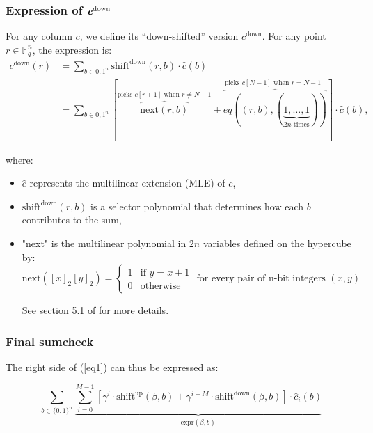 \documentclass{article}
\newcommand{\Fq}{\mathbb F_q}
\begin{document}
\subsubsection{\texorpdfstring{Expression of $\textbf{\textit{c}}^{\text{down}}$}{}}


For any column $c$, we define its “down-shifted” version $c^{\text{down}}$. For any point $r \in \Fq^n$, the expression is:
\begin{equation*}
\begin{aligned}
c^{\text{down}}(r) &= \sum_{b \in {0, 1}^n} \text{shift}^{\text{down}}(r, b) \cdot \widehat{c}(b) \\
&= \sum_{b \in {0, 1}^n} \left[ \overbrace{\text{next}(r, b)}^{\text{picks $c[r + 1]$ when $r \neq N - 1$}} + \overbrace{eq((r, b), (\underbrace{1, \dots, 1}_{2n \text{ times}}))}^{\text{picks $c[N - 1]$ when $r = N - 1$ }} \right] \cdot \widehat{c}(b),
\end{aligned}
\end{equation*}



where:
\begin{itemize}
    \item $\widehat{c}$ represents the multilinear extension (MLE) of $c$,
    \item $\text{shift}^{\text{down}}(r, b)$ is a selector polynomial that determines how each $b$ contributes to the sum,
    \item "next" is the multilinear polynomial in $2n$ variables defined on the hypercube by:    
    $$\text{next}([x]_2 [y]_2)  = \begin{cases}
    			1 & \text{if } y = x +1\\
                0 & \text{otherwise}
    		 \end{cases} \text{ for every pair of n-bit integers } (x, y)$$
    
    See section 5.1 of \cite{ccs} for more details.
\end{itemize}




\subsubsection{Final sumcheck}

The right side of (\ref{eq1}) can thus be expressed as:

$$\sum_{b \in \{0, 1\}^n} \underbrace{\sum_{i = 0}^{M-1} [\gamma^i \cdot \text{shift}^{\text{up}}(\beta, b) + \gamma^{i+M} \cdot \text{shift}^{\text{down}}(\beta, b) ] \cdot \widehat{c}_i(b)}_{\text{expr}(\beta, b)}$$
\end{document}
